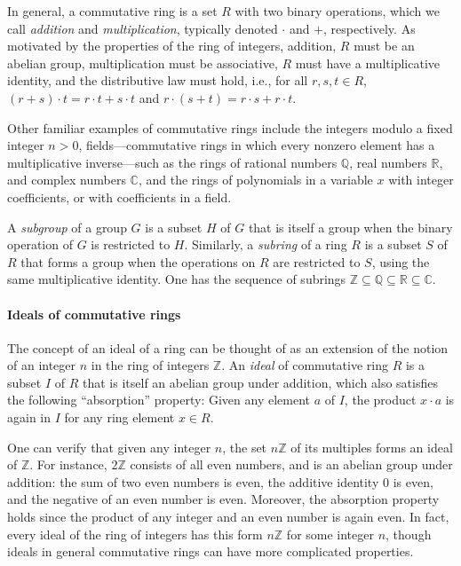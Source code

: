 \documentclass{article}
\begin{document}
In general, a commutative ring is a set $R$ with two binary operations, which
we call \emph{addition} and \emph{multiplication}, typically denoted $\cdot$
and $+$, respectively. As motivated by the properties of the ring of integers,
addition, $R$ must be an abelian group, multiplication must be associative, $R$
must have a multiplicative identity, and the distributive law must hold, i.e.,
for all $r, s, t \in R$, $(r+s)\cdot t = r \cdot t + s \cdot t$ and
$r \cdot (s+t) = r \cdot s + r \cdot t$.

Other familiar examples of commutative rings include the integers modulo a
fixed integer $n>0$, fields---commutative rings in which every nonzero element
has a multiplicative inverse---such as the rings of rational numbers $\mathbb{Q}$, real
numbers $\mathbb{R}$, and complex numbers $\mathbb{C}$, and the rings
 of polynomials in a variable $x$ with
integer coefficients, or with coefficients in a field.

A \emph{subgroup} of a group $G$ is a subset  $H$ of $G$ that is itself a 
group when the binary operation of $G$ is restricted to $H$.
Similarly, a \emph{subring} of a ring $R$
is a subset $S$ of $R$ that forms a group when the operations on $R$ are 
restricted to $S$, using the same multiplicative identity.  
One has the sequence of subrings $\mathbb{Z} \subseteq \mathbb{Q} \subseteq \mathbb{R} \subseteq \mathbb{C}$. 

\paragraph{Ideals of commutative rings}
The concept of an {ideal} of a ring can be thought of as an extension of the
notion of an integer $n$ in the ring of integers $\mathbb{Z}$. An \emph{ideal}
of commutative ring $R$ is a subset $I$ of $R$ that is itself an abelian group
under addition, which also satisfies the following ``absorption'' property:
Given any element $a$ of $I$, the product  $x \cdot a$ is again in $I$ for any
ring element $x \in R$. 

One can verify that given any integer $n$, the set $n\mathbb{Z}$ of its
multiples forms an ideal of $\mathbb{Z}$. For instance, $2 \mathbb{Z}$
consists of all even numbers, and is an abelian group under addition: the sum
of two even numbers is even, the additive identity $0$ is even, and the
negative of an even number is even. Moreover, the absorption property holds
since the product of any integer and an even number is again even. In fact,
every ideal of the ring of integers has this form $n\mathbb{Z}$ for some
integer $n$, though ideals in general commutative rings can have more
complicated properties. 
\end{document}
